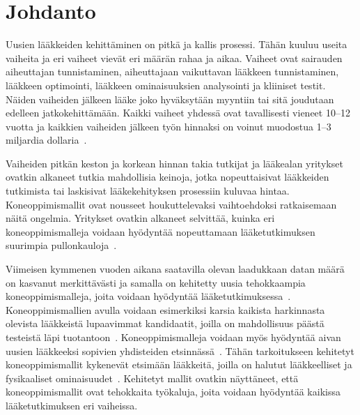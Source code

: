 \documentclass[finnish,twoside,censored,tkt,sw-line]{HYthesisML}
\begin{document}
\newpage
\mytableofcontents{}
\mainmatter{}


%
%
%
% 


\chapter{Johdanto}

Uusien lääkkeiden kehittäminen on pitkä ja kallis prosessi.
Tähän kuuluu useita vaiheita ja eri vaiheet vievät eri määrän rahaa ja aikaa.
Vaiheet ovat sairauden aiheuttajan tunnistaminen, aiheuttajaan vaikuttavan lääkkeen tunnistaminen, lääkkeen optimointi, lääkkeen ominaisuuksien analysointi ja kliiniset testit.
Näiden vaiheiden jälkeen lääke joko hyväksytään myyntiin tai sitä joudutaan edelleen jatkokehittämään.
Kaikki vaiheet yhdessä ovat tavallisesti vieneet 10--12 vuotta ja kaikkien vaiheiden jälkeen työn hinnaksi on voinut muodostua 1--3 miljardia dollaria~\cite{EkinsSean2019Emlf}.

Vaiheiden pitkän keston ja korkean hinnan takia tutkijat ja lääkealan yritykset ovatkin alkaneet tutkia mahdollisia keinoja, jotka nopeuttaisivat lääkkeiden tutkimista tai laskisivat lääkekehityksen prosessiin kuluvaa hintaa.
Koneoppimismallit ovat nousseet houkuttelevaksi vaihtoehdoksi ratkaisemaan näitä ongelmia.
Yritykset ovatkin alkaneet selvittää, kuinka eri koneoppimismalleja voidaan hyödyntää nopeuttamaan lääketutkimuksen suurimpia pullonkauloja~\cite{EkinsSean2019Emlf}.

Viimeisen kymmenen vuoden aikana saatavilla olevan laadukkaan datan määrä on kasvanut merkittävästi ja samalla on kehitetty uusia tehokkaampia koneoppimismalleja, joita voidaan hyödyntää lääketutkimuksessa~\cite{ButlerKeithT2018Mlfm,VamathevanJessica2019Aoml}.
Koneoppimismallien avulla voidaan esimerkiksi karsia kaikista harkinnasta olevista lääkkeistä lupaavimmat kandidaatit, joilla on mahdollisuus päästä testeistä läpi tuotantoon~\cite{GayvertKaitlyn}.
Koneoppimismalleja voidaan myös hyödyntää aivan uusien lääkkeeksi sopivien yhdisteiden etsinnässä~\cite{ShinBonggun,ShaharHarelAndKiraRadinsky}.
Tähän tarkoitukseen kehitetyt koneoppimismallit kykenevät etsimään lääkkeitä, joilla on halutut lääkkeelliset ja fysikaaliset ominaisuudet~\cite{VamathevanJessica2019Aoml}.
Kehitetyt mallit ovatkin näyttäneet, että koneoppimismallit ovat tehokkaita työkaluja, joita voidaan hyödyntää kaikissa lääketutkimuksen eri vaiheissa.
\end{document}
